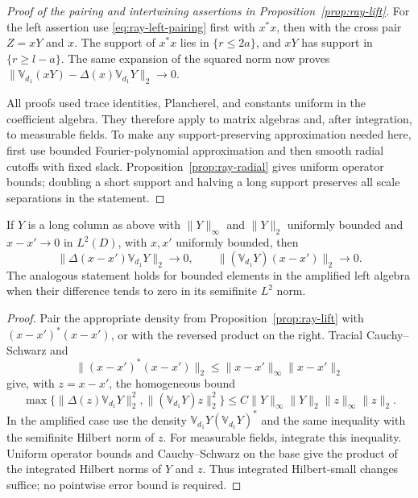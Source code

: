 \begin{proof}[Proof of the pairing and intertwining assertions in
Proposition~\ref{prop:ray-lift}]
For the left assertion use
\eqref{eq:ray-left-pairing} first with \(x^*x\), then with
the cross pair \(Z=xY\) and \(x\).  The support of \(x^*x\) lies
in \(\{r\le2a\}\), and \(xY\) has support in
\(\{r\ge l-a\}\).  The same expansion of the squared norm now
proves \(\|\mathbb V_{d_1}(xY)-\Delta(x)\mathbb V_{d_1}Y\|_2\to0\).

All proofs used trace identities, Plancherel, and constants uniform
in the coefficient algebra.  They therefore apply to matrix
algebras and, after integration, to measurable fields.  To make
any support-preserving approximation needed here, first use bounded
Fourier-polynomial approximation and then smooth radial cutoffs
with fixed slack.  Proposition~\ref{prop:ray-radial} gives
uniform operator bounds; doubling a short support and halving a
long support preserves all scale separations in the statement.
\end{proof}

\begin{corollary}
\label{cor:ray-small-change}
If \(Y\) is a long column as above with
\(\|Y\|_\infty\) and \(\|Y\|_2\) uniformly bounded and
\(x-x'\to0\) in \(L^2(D)\), with \(x,x'\) uniformly bounded, then
\[
 \|\Delta(x-x')\mathbb V_{d_1}Y\|_2\longrightarrow0,
 \qquad \|(\mathbb V_{d_1}Y)(x-x')\|_2\longrightarrow0.
\]
The analogous statement holds for bounded elements in the amplified
left algebra when their difference tends to zero in its semifinite
\(L^2\) norm.
\end{corollary}

\begin{proof}
Pair the appropriate density from Proposition~\ref{prop:ray-lift}
with \((x-x')^*(x-x')\), or with the reversed product on the right.
Tracial Cauchy--Schwarz and
\[
 \|(x-x')^*(x-x')\|_2
             \le\|x-x'\|_\infty\|x-x'\|_2
\]
give, with \(z=x-x'\), the homogeneous bound
\begin{equation}\label{eq:ray-small-change-bound}
 \max\{\|\Delta(z)\mathbb V_{d_1}Y\|_2^2,
              \|(\mathbb V_{d_1}Y)z\|_2^2\}
 \le C\|Y\|_\infty\|Y\|_2\|z\|_\infty\|z\|_2.
\end{equation}
In the amplified case use the density
\(\mathbb V_{d_1}Y(\mathbb V_{d_1}Y)^*\) and the same inequality
with the semifinite Hilbert norm of \(z\).
For measurable fields, integrate this inequality.  Uniform
operator bounds and Cauchy--Schwarz on the base give the product of
the integrated Hilbert norms of \(Y\) and \(z\).  Thus integrated
Hilbert-small changes suffice; no pointwise error bound is required.
\end{proof}

